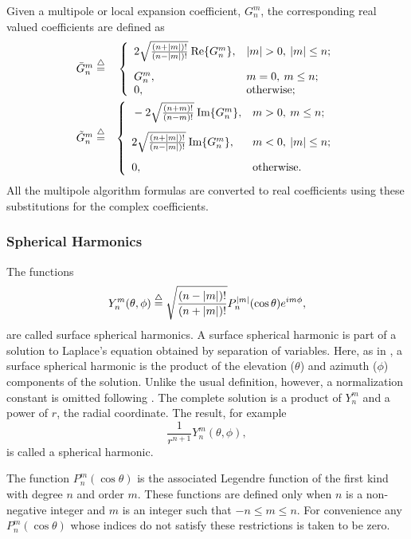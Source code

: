 Given a multipole or local expansion coefficient, $G_n^m$, the corresponding
real valued coefficients are defined as
\begin{eqnarray}
\Gb{n}{m} &\trieq& \left\{
\begin{array}{ll}
\rule[-5mm]{0mm}{5mm}2\sqrt{\frac{(n+|m|)!}{(n-|m|)!}}\:\mbox{Re}\{G_n^m\}, & |m|>0,\: |m|\leq n;\\
G_n^m, & m=0,\: m\leq n;\\
0, &\mbox{otherwise;}
\end{array}
\right.\label{bardef}\\
\Gbb{n}{m} &\trieq & \left\{
\begin{array}{ll}
\rule[-5mm]{0mm}{5mm}-2\sqrt{\frac{(n+m)!}{(n-m)!}}\:\mbox{Im}\{G_n^m\}, & m>0,\: m\leq n;\\
\rule[-5mm]{0mm}{5mm}2\sqrt{\frac{(n+|m|)!}{(n-|m|)!}}\:\mbox{Im}\{G_n^m\}, & m<0,\: |m|\leq n;\\
0, & \mbox{otherwise.}
\end{array}
\right.\label{dbrdef}
\end{eqnarray}
All the multipole algorithm formulas are converted to real coefficients using
these substitutions for the complex coefficients.

\subsubsection{Spherical Harmonics}

The functions
\begin{equation}
Y_n^m(\theta, \phi)\stackrel{\triangle}{=}\sqrt{\frac{(n-|m|)!}{(n+|m|)!}}P_n^{|m|}(\cos\theta)e^{im\phi},
\label{sphhar}
\end{equation}
are called surface spherical harmonics.  
A surface spherical harmonic
is part of a solution to Laplace's equation obtained by separation
of variables. 
Here, as in \cite{jac}, 
a surface spherical harmonic is the product of the
elevation ($\theta$) and azimuth ($\phi$) components of the solution.
Unlike the usual definition, however,
a normalization constant is omitted following \cite{gre,fft}.
The complete solution is a product of $Y_n^m$ and a power of $r$, 
the radial coordinate. The result, for example
\begin{equation}
\frac{1}{r^{n+1}}Y_n^m(\theta, \phi),
\label{spfrac}
\end{equation}
is called a spherical harmonic.


The function $P_n^{m}(\cos\theta)$ is the associated Legendre function 
of the first kind with degree $n$ and order $m$. These functions are
defined only when $n$ is a non-negative integer and $m$ is an integer
such that $-n\leq m\leq n$. For convenience any $P_n^{m}(\cos\theta)$
whose indices do not satisfy these restrictions is taken to be zero.

